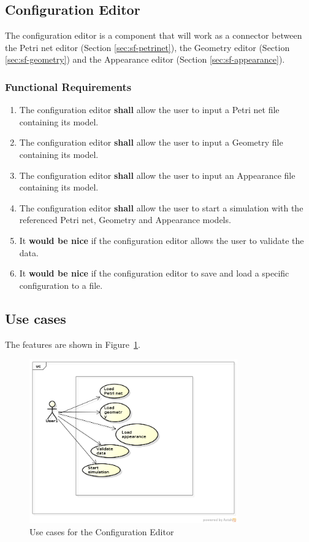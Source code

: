 \subsection{Configuration Editor}

The configuration editor is a component that will work as a connector between the Petri net editor (Section \ref{sec:sf-petrinet}), the Geometry editor (Section \ref{sec:sf-geometry}) and the Appearance editor (Section \ref{sec:sf-appearance}). 

\subsubsection{Functional Requirements}

\begin{enumerate}
	\item The configuration editor \textbf{shall} allow the user to input a Petri net file containing its model.
	\item The configuration editor \textbf{shall} allow the user to input a Geometry file containing its model.
	\item The configuration editor \textbf{shall} allow the user to input an Appearance file containing its model.
	\item The configuration editor \textbf{shall} allow the user to start a simulation with the referenced Petri net, Geometry and Appearance models.
	\item It \textbf{would be nice} if the configuration editor allows the user to validate the data.
	\item It \textbf{would be nice} if the configuration editor to save and load a specific configuration to a file.
\end{enumerate}

\subsection{Use cases}

The features are shown in Figure~\ref{fig:use-cases-configuration}.

\begin{figure}[htp]
\begin{center}
  \includegraphics[width=0.8\textwidth]{image/uc-configuration.png}
  \caption{Use cases for the Configuration Editor}
  \label{fig:use-cases-configuration}
\end{center}
\end{figure}